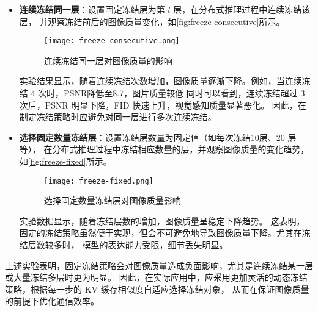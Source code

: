 \begin{itemize}
    \item \textbf{连续冻结同一层}：设置固定冻结层为第 $l$ 层，在分布式推理过程中连续冻结该层，
    并观察冻结前后的图像质量变化，如\autoref{fig:freeze-consecutive}所示。
    \begin{figure}[ht]
        \centering
        \texttt{[image: freeze-consecutive.png]}
        \caption{连续冻结同一层对图像质量的影响}
        \label{fig:freeze-consecutive}
    \end{figure}
    实验结果显示，随着连续冻结次数增加，图像质量逐渐下降。例如，当连续冻结 4 次时，PSNR降低至8.7，图片质量较低
    同时可以看到，连续冻结超过 3 次后，PSNR 明显下降，FID 快速上升，视觉感知质量显著恶化。
    因此，在制定冻结策略时应避免对同一层进行多次连续冻结。
    \item \textbf{选择固定数量冻结层}：设置冻结层数量为固定值（如每次冻结10层、20 层等），
    在分布式推理过程中冻结相应数量的层，并观察图像质量的变化趋势，如\autoref{fig:freeze-fixed}所示。
    \begin{figure}[ht]
        \centering
        \texttt{[image: freeze-fixed.png]}
        \caption{选择固定数量冻结层对图像质量影响}
        \label{fig:freeze-fixed}
    \end{figure}
    实验数据显示，随着冻结层数的增加，图像质量呈稳定下降趋势。
    这表明，固定的冻结策略虽然便于实现，但会不可避免地导致图像质量下降。尤其在冻结层数较多时，
    模型的表达能力受限，细节丢失明显。
\end{itemize}
\par
上述实验表明，固定冻结策略会对图像质量造成负面影响，尤其是连续冻结某一层或大量冻结多层时更为明显。
因此，在实际应用中，应采用更加灵活的动态冻结策略，根据每一步的 KV 缓存相似度自适应选择冻结对象，
从而在保证图像质量的前提下优化通信效率。

